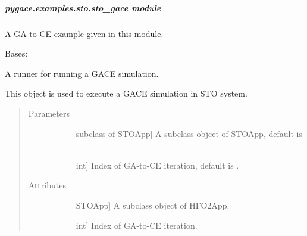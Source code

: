 \documentclass[letterpaper,10pt,english]{sphinxmanual}
\begin{document}
\subparagraph{pygace.examples.sto.sto\_gace module}
\label{\detokenize{pygace.examples.sto:pygace-examples-sto-sto-gace-module}}\label{\detokenize{pygace.examples.sto:module-pygace.examples.sto.sto_gace}}
A GA-to-CE example given in this module.

\begin{fulllineitems}
\label{\detokenize{pygace.examples.sto:pygace.examples.sto.sto_gace.Runner}}
Bases: {\hyperref[\detokenize{pygace:pygace.gace.AbstractRunner}]{}}

A runner for running a GACE simulation.

This object is used to execute a GACE simulation in STO system.
\begin{quote}\begin{description}
\item[{Parameters}] \leavevmode\begin{description}
\item[{}] \leavevmode{[}subclass of STOApp{]}
A subclass object of STOApp, default is .

\item[{}] \leavevmode{[}int{]}
Index of GA-to-CE iteration, default is .

\end{description}

\item[{Attributes}] \leavevmode\begin{description}
\item[{}] \leavevmode{[}STOApp{]}
A subclass object of HFO2App.

\item[{}] \leavevmode{[}int{]}
Index of GA-to-CE iteration.

\end{description}

\end{description}\end{quote}


\end{fulllineitems}
\end{document}
